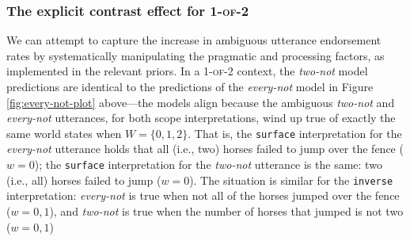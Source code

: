 \documentclass[cm]{glossa}
\newcommand{\lp}[1]{\textcolor{black}{#1}} %
\begin{document}
\subsubsection{The explicit contrast effect for \textsc{1-of-2}}


We can attempt to capture the increase in ambiguous utterance endorsement rates by systematically manipulating the pragmatic and processing factors, as implemented in the relevant priors. In a \textsc{1-of-2} context, the \emph{two-not} model predictions are identical to the predictions of the \emph{every-not} model in Figure \ref{fig:every-not-plot} above---the models align because the ambiguous \emph{two-not} and \emph{every-not} utterances, for both scope interpretations, wind up true of exactly the same world states when $W = \{0, 1, 2\}$. 
That is, the \texttt{surface} interpretation for the \textit{every-not} utterance 
holds that all (i.e., two) horses failed to jump over the fence ($w=0$); 
the \texttt{surface} interpretation for the \textit{two-not} utterance 
is the same: two (i.e., all) horses failed to jump ($w=0$).
The situation is similar for the \texttt{inverse} interpretation: \emph{every-not} is true when not all of the horses jumped over the fence ($w = 0, 1$), and \emph{two-not} is true when the number of horses that jumped is not two ($w = 0,1$)
\end{document}
